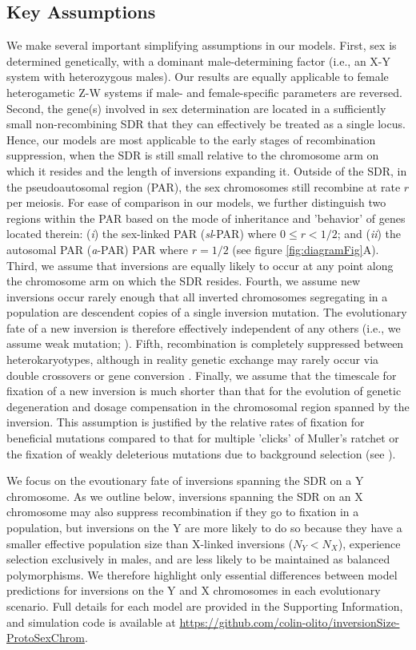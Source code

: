 \documentclass{article}
\begin{document}
\subsection*{Key Assumptions} \label{sec:assumptions}
We make several important simplifying assumptions in our models. First, sex is determined genetically, with a dominant male-determining factor (i.e., an X-Y system with heterozygous males). Our results are equally applicable to female heterogametic Z-W systems if male- and female-specific parameters are reversed. Second, the gene(s) involved in sex determination are located in a sufficiently small non-recombining SDR that they can effectively be treated as a single locus. Hence, our models are most applicable to the early stages of recombination suppression, when the SDR is still small relative to the chromosome arm on which it resides and the length of inversions expanding it. Outside of the SDR, in the pseudoautosomal region (PAR), the sex chromosomes still recombine at rate $r$ per meiosis. For ease of comparison in our models, we further distinguish two regions within the PAR based on the mode of inheritance and 'behavior' of genes located therein: ({\itshape i}) the sex-linked PAR ({\itshape sl}-PAR) where $0 \leq r < 1/2$; and ({\itshape ii}) the autosomal PAR ({\itshape a}-PAR) PAR where $r = 1/2$ (see figure \ref{fig:diagramFig}A). Third, we assume that inversions are equally likely to occur at any point along the chromosome arm on which the SDR resides. Fourth, we assume new inversions occur rarely enough that all inverted chromosomes segregating in a population are descendent copies of a single inversion mutation. The evolutionary fate of a new inversion is therefore effectively independent of any others (i.e., we assume weak mutation; \citealt{Gillespie1991}). Fifth, recombination is completely suppressed between heterokaryotypes, although in reality genetic exchange may rarely occur via double crossovers or gene conversion \citep{KrimbasPowell1992, KorunesNoor2019}. Finally, we assume that the timescale for fixation of a new inversion is much shorter than that for the evolution of genetic degeneration and dosage compensation in the chromosomal region spanned by the inversion. This assumption is justified by the relative rates of fixation for beneficial mutations compared to that for multiple 'clicks' of Muller's ratchet or the fixation of weakly deleterious mutations due to background selection (see \citealt{Charlesworth2000, Bachtrog2008}).

We focus on the evoutionary fate of inversions spanning the SDR on a Y chromosome. As we outline below, inversions spanning the SDR on an X chromosome may also suppress recombination if they go to fixation in a population, but inversions on the Y are more likely to do so because they have a smaller effective population size than X-linked inversions ($N_Y < N_X$), experience selection exclusively in males, and are less likely to be maintained as balanced polymorphisms. We therefore highlight only essential differences between model predictions for inversions on the Y and X chromosomes in each evolutionary scenario. Full details for each model are provided in the Supporting Information, and simulation code is available at \url{https://github.com/colin-olito/inversionSize-ProtoSexChrom}.
\end{document}

